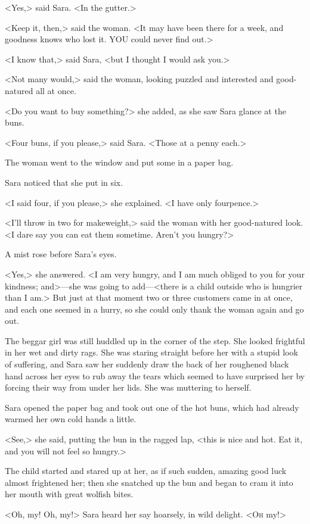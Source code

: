<Yes,> said Sara. <In the gutter.>

<Keep it, then,> said the woman. <It may have been there for a week, and goodness knows who lost it. YOU could never find out.>

<I know that,> said Sara, <but I thought I would ask you.>

<Not many would,> said the woman, looking puzzled and interested and good-natured all at once.

<Do you want to buy something?> she added, as she saw Sara glance at the buns.

<Four buns, if you please,> said Sara. <Those at a penny each.>

The woman went to the window and put some in a paper bag.

Sara noticed that she put in six.

<I said four, if you please,> she explained. <I have only fourpence.>

<I'll throw in two for makeweight,> said the woman with her good-natured look. <I dare say you can eat them sometime. Aren't you hungry?>

A mist rose before Sara's eyes.

<Yes,> she answered. <I am very hungry, and I am much obliged to you for your kindness; and>—she was going to add—<there is a child outside who is hungrier than I am.> But just at that moment two or three customers came in at once, and each one seemed in a hurry, so she could only thank the woman again and go out.

The beggar girl was still huddled up in the corner of the step. She looked frightful in her wet and dirty rags. She was staring straight before her with a stupid look of suffering, and Sara saw her suddenly draw the back of her roughened black hand across her eyes to rub away the tears which seemed to have surprised her by forcing their way from under her lids. She was muttering to herself.

Sara opened the paper bag and took out one of the hot buns, which had already warmed her own cold hands a little.

<See,> she said, putting the bun in the ragged lap, <this is nice and hot. Eat it, and you will not feel so hungry.>

The child started and stared up at her, as if such sudden, amazing good luck almost frightened her; then she snatched up the bun and began to cram it into her mouth with great wolfish bites.

<Oh, my! Oh, my!> Sara heard her say hoarsely, in wild delight. <\textsc{Oh} my!>

